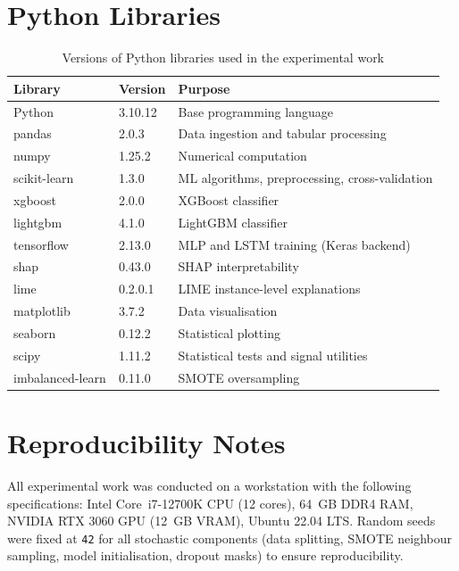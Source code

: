 \section{Python Libraries}

\begin{table}[H]
\centering
\caption{Versions of Python libraries used in the experimental work}
\label{tab:python_env}
\begin{tabular}{lll}
\toprule
\textbf{Library} & \textbf{Version} & \textbf{Purpose} \\
\midrule
Python           & 3.10.12 & Base programming language \\
pandas           & 2.0.3   & Data ingestion and tabular processing \\
numpy            & 1.25.2  & Numerical computation \\
scikit-learn     & 1.3.0   & ML algorithms, preprocessing, cross-validation \\
xgboost          & 2.0.0   & XGBoost classifier \\
lightgbm         & 4.1.0   & LightGBM classifier \\
tensorflow       & 2.13.0  & MLP and LSTM training (Keras backend) \\
shap             & 0.43.0  & SHAP interpretability \\
lime             & 0.2.0.1 & LIME instance-level explanations \\
matplotlib       & 3.7.2   & Data visualisation \\
seaborn          & 0.12.2  & Statistical plotting \\
scipy            & 1.11.2  & Statistical tests and signal utilities \\
imbalanced-learn & 0.11.0  & SMOTE oversampling \\
\bottomrule
\end{tabular}
\end{table}

\section{Reproducibility Notes}

All experimental work was conducted on a workstation with the following specifications: Intel Core~i7-12700K CPU (12 cores), 64~GB DDR4 RAM, NVIDIA RTX 3060 GPU (12~GB VRAM), Ubuntu 22.04 LTS. Random seeds were fixed at \texttt{42} for all stochastic components (data splitting, SMOTE neighbour sampling, model initialisation, dropout masks) to ensure reproducibility.

